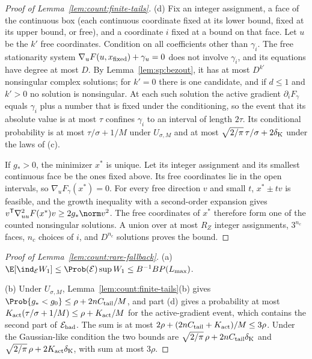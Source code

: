 \begin{proof}[Proof of Lemma~\ref{lem:count:finite-tails}]
(d) Fix an integer assignment, a face of the continuous box (each continuous
coordinate fixed at its lower bound, fixed at its upper bound, or free), and
a coordinate $i$ fixed at a bound on that face. Let $u$ be the $k'$ free
coordinates. Condition on all coefficients other than $\gamma_i$. The free
stationarity system $\nabla_uF(u,x_{\rm fixed})+\gamma_u=0$ does not involve
$\gamma_i$, and its equations have degree at most $D$. By
Lemma~\ref{lem:sp:bezout}, it has at most $D^{k'}$ nonsingular
complex solutions; for $k'=0$ there is one candidate, and if $d\le1$ and
$k'>0$ no solution is nonsingular. At each
such solution the active gradient $\partial_iF_\gamma$ equals $\gamma_i$ plus
a number that is fixed under the conditioning, so the event that its absolute
value is at most $\tau$ confines $\gamma_i$ to an interval of length $2\tau$.
Its conditional probability is at most $\tau/\sigma+1/M$ under
$U_{\sigma,M}$ and at most $\sqrt{2/\pi}\,\tau/\sigma+2\delta_{\rm K}$
under the laws of (c).

If $g_*>0$, the minimizer $x^*$ is unique. Let its integer assignment and
its smallest continuous face be the ones fixed above. Its free coordinates lie
in the open intervals, so $\nabla_uF_\gamma(x^*)=0$. For every free direction
$v$ and small $t$, $x^*\pm tv$ is feasible, and the growth inequality with a
second-order expansion gives $v^{\mathsf T}\nabla_{uu}^2F(x^*)v\ge2g_*\norm v^2$. The
free coordinates of $x^*$ therefore form one of the counted nonsingular
solutions. A union over at most $R_Z$ integer assignments, $3^{n_c}$ faces,
$n_c$ choices of $i$, and $D^{n_c}$ solutions proves the bound.
\end{proof}

\begin{proof}[Proof of Lemma~\ref{lem:count:rare-fallback}]
(a) $\E[\ind_{\mathcal E}W_1]\le\Prob(\mathcal E)\sup W_1\le B^{-1}BP(L_{\max})$.

(b) Under $U_{\sigma,M}$, Lemma~\ref{lem:count:finite-tails}(b) gives
$\Prob\{g_*<g_0\}\le\rho+2nC_{\rm tail}/M$, and part (d) gives a probability
at most $K_{\rm act}(\tau/\sigma+1/M)\le\rho+K_{\rm act}/M$ for the
active-gradient event, which contains the second part of
$\mathcal E_{\rm bad}$. The sum is at most $2\rho+(2nC_{\rm tail}+K_{\rm act})/M\le3\rho$.
Under the Gaussian-like condition the two bounds are
$\sqrt{2/\pi}\,\rho+2nC_{\rm tail}\delta_{\rm K}$ and
$\sqrt{2/\pi}\,\rho+2K_{\rm act}\delta_{\rm K}$, with sum at most $3\rho$.
\end{proof}

